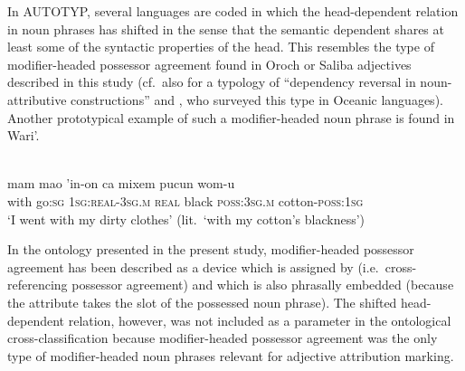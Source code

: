 In AUTOTYP, several languages are coded in which the head-dependent relation in noun phrases has shifted in the sense that the semantic dependent shares at least some of the syntactic properties of the head. This resembles the type of modifier\hyp{}headed possessor agreement found in Oroch or Saliba adjectives described in this study (cf.~also \citealt{malchukov2000} for a typology of “dependency reversal in noun-attributive constructions” and \citealt{ross1998}, who surveyed this type in Oceanic languages). Another prototypical example of such a modifier\hyp{}headed noun phrase is found in Wari'.
\begin{exe}
\ex \label{ex1} \\
  \gll	mam mao 'in-on		ca	    mixem  pucun	wom-u\\
  	with  go:\textsc{sg}  \textsc{1sg:real-3sg.m}	\textsc{real}  black    \textsc{poss:3sg.m}	cotton-\textsc{poss:1sg}\\
  \glt ‘I went with my dirty clothes’ (lit.~‘with my cotton's blackness’)
\end{exe}
In the ontology presented in the present study, modifier\hyp{}headed possessor agreement has been described as a device which is assigned by  (i.e.~cross-referencing possessor agreement) and which is also phrasally embedded (because the attribute takes the slot of the possessed noun phrase). The shifted head-dependent relation, however, was not included as a parameter in the ontological cross-classification because modifier\hyp{}headed possessor agreement was the only type of modifier\hyp{}headed noun phrases relevant for adjective attribution marking.

